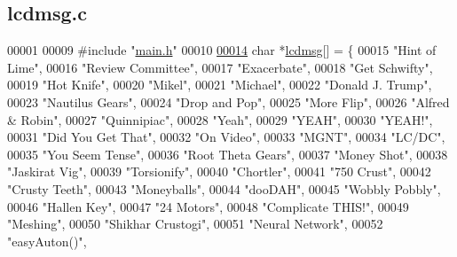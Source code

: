 \hypertarget{lcdmsg_8c_source}{}\subsection{lcdmsg.\+c}
\label{lcdmsg_8c_source}

\begin{DoxyCode}
00001 
00009 \textcolor{preprocessor}{#include "\hyperlink{main_8h}{main.h}"}
00010 
\hypertarget{lcdmsg_8c_source.tex_l00014}{}\hyperlink{lcdmsg_8h_abbcf1856a4c9063200ef3f4131fd05f5}{00014} \textcolor{keywordtype}{char} *\hyperlink{lcdmsg_8c_abbcf1856a4c9063200ef3f4131fd05f5}{lcdmsg}[] = \{
00015     \textcolor{stringliteral}{"Hint of Lime"},
00016     \textcolor{stringliteral}{"Review Committee"},
00017     \textcolor{stringliteral}{"Exacerbate"},
00018     \textcolor{stringliteral}{"Get Schwifty"},
00019     \textcolor{stringliteral}{"Hot Knife"},
00020     \textcolor{stringliteral}{"Mikel"},
00021     \textcolor{stringliteral}{"Michael"},
00022     \textcolor{stringliteral}{"Donald J. Trump"},
00023     \textcolor{stringliteral}{"Nautilus Gears"},
00024     \textcolor{stringliteral}{"Drop and Pop"},
00025     \textcolor{stringliteral}{"More Flip"},
00026     \textcolor{stringliteral}{"Alfred & Robin"},
00027     \textcolor{stringliteral}{"Quinnipiac"},
00028     \textcolor{stringliteral}{"Yeah"},
00029     \textcolor{stringliteral}{"YEAH"},
00030     \textcolor{stringliteral}{"YEAH!"},
00031     \textcolor{stringliteral}{"Did You Get That"},
00032     \textcolor{stringliteral}{"On Video"},
00033     \textcolor{stringliteral}{"MGNT"},
00034     \textcolor{stringliteral}{"LC/DC"},
00035     \textcolor{stringliteral}{"You Seem Tense"},
00036     \textcolor{stringliteral}{"Root Theta Gears"},
00037     \textcolor{stringliteral}{"Money Shot"},
00038     \textcolor{stringliteral}{"Jaskirat Vig"},
00039     \textcolor{stringliteral}{"Torsionify"},
00040     \textcolor{stringliteral}{"Chortler"},
00041     \textcolor{stringliteral}{"750 Crust"},
00042     \textcolor{stringliteral}{"Crusty Teeth"},
00043     \textcolor{stringliteral}{"Moneyballs"},
00044     \textcolor{stringliteral}{"dooDAH"},
00045     \textcolor{stringliteral}{"Wobbly Pobbly"},
00046     \textcolor{stringliteral}{"Hallen Key"},
00047     \textcolor{stringliteral}{"24 Motors"},
00048     \textcolor{stringliteral}{"Complicate THIS!"},
00049     \textcolor{stringliteral}{"Meshing"},
00050     \textcolor{stringliteral}{"Shikhar Crustogi"},
00051     \textcolor{stringliteral}{"Neural Network"},
00052     \textcolor{stringliteral}{"easyAuton()"},

\end{DoxyCode}
